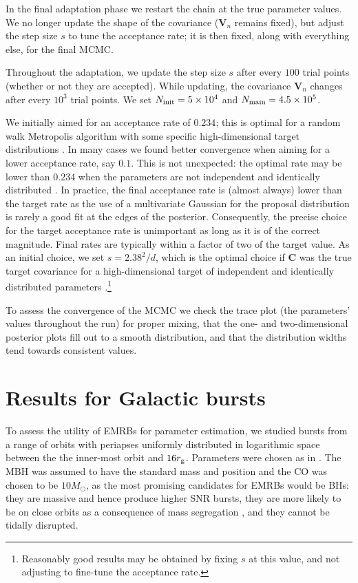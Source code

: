 In the final adaptation phase we restart the chain at the true parameter values. We no longer update the shape of the covariance ($\boldsymbol{V}_n$ remains fixed), but adjust the step size $s$ to tune the acceptance rate; it is then fixed, along with everything else, for the final MCMC.

Throughout the adaptation, we update the step size $s$ after every $100$ trial points (whether or not they are accepted). While updating, the covariance $\boldsymbol{V}_n$ changes after every $10^3$ trial points. We set $N_\mathrm{init} = 5 \times 10^4$ and $N_\mathrm{main} = 4.5 \times 10^5$.

We initially aimed for an acceptance rate of $0.234$; this is optimal for a random walk Metropolis algorithm with some specific high-dimensional target distributions \citep{Roberts1997,Roberts2001}. In many cases we found better convergence when aiming for a lower acceptance rate, say $0.1$. This is not unexpected: the optimal rate may be lower than $0.234$ when the parameters are not independent and identically distributed \citep{Bedard2007, Bedard2008a, Bedard2008}. In practice, the final acceptance rate is (almost always) lower than the target rate as the use of a multivariate Gaussian for the proposal distribution is rarely a good fit at the edges of the posterior. Consequently, the precise choice for the target acceptance rate is unimportant as long as it is of the correct magnitude. Final rates are typically within a factor of two of the target value. As an initial choice, we set $s = 2.38^2/d$, which is the optimal choice if $\boldsymbol{C}$ was the true target covariance for a high-dimensional target of independent and identically distributed parameters \citep{Gelman1996,Roberts1997,Roberts2001,Haario2001}.\footnote{Reasonably good results may be obtained by fixing $s$ at this value, and not adjusting to fine-tune the acceptance rate.}

To assess the convergence of the MCMC we check the trace plot (the parameters' values throughout the run) for proper mixing, that the one- and two-dimensional posterior plots fill out to a smooth distribution, and that the distribution widths tend towards consistent values.

\section{Results for Galactic bursts}\label{sec:Gal-Results}

To assess the utility of EMRBs for parameter estimation, we studied bursts from a range of orbits with periapses uniformly distributed in logarithmic space between the the inner-most orbit and $16 r_\mathrm{g}$. Parameters were chosen as in . The MBH was assumed to have the standard mass and position and the CO was chosen to be $10 M_\odot$, as the most promising candidates for EMRBs would be BHs: they are massive and hence produce higher SNR bursts, they are more likely to be on close orbits as a consequence of mass segregation \citep{Bahcall1977, Alexander2009}, and they cannot be tidally disrupted.

